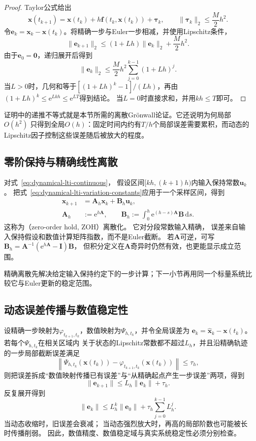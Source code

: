 \begin{proof}
	Taylor公式给出
	\[
		\bm{x}(t_{k+1})
		=\bm{x}(t_k)+h\bm{f}(t_k,\bm{x}(t_k))+\bm{\tau}_k,
		\qquad \lVert\bm{\tau}_k\rVert_2\leq \frac{M}{2}h^2.
	\]
	令$\bm{e}_k=\bm{x}_k-\bm{x}(t_k)$。将精确一步与Euler一步相减，并使用Lipschitz条件，
	\[
		\lVert\bm{e}_{k+1}\rVert_2
		\leq(1+Lh)\lVert\bm{e}_k\rVert_2+\frac{M}{2}h^2.
	\]
	由于$\bm{e}_0=\bm{0}$，递归展开后得到
	\[
		\lVert\bm{e}_k\rVert_2
		\leq\frac{M}{2}h^2\sum_{j=0}^{k-1}(1+Lh)^j.
	\]
	当$L>0$时，几何和等于$[(1+Lh)^k-1]/(Lh)$，再由
	$(1+Lh)^k\leq\mathrm{e}^{Lkh}\leq\mathrm{e}^{LT}$得到结论。
	当$L=0$时直接求和，并用$kh\leq T$即可。
\end{proof}

证明中的递推不等式就是本节所需的离散Grönwall论证。它还说明为何局部$O(h^2)$
只得到全局$O(h)$：固定时间内约有$T/h$个局部误差需要累积，而动态的Lipschitz因子控制这些误差随后被放大的程度。

\subsection{零阶保持与精确线性离散}

对式~\eqref{eq:dynamical-lti-continuous}， 假设区间$[kh,(k+1)h)$内输入保持常数$\bm
{u}_{k}$。 把式~\eqref{eq:dynamical-lti-variation-constants}应用于一个采样区间，得到
\begin{align}
	\bm{x}_{k+1} & = \bm{A}_{h}\bm{x}_{k}+\bm{B}_{h}\bm{u}_{k}, \label{eq:dynamical-zoh-discrete}                                                          \\
	\bm{A}_{h}   & := \mathrm{e}^{h\bm{A}}, \qquad \bm{B}_{h}:= \int_{0}^{h}\mathrm{e}^{(h-s)\bm{A}}\bm{B}\,\mathrm{d}s. \label{eq:dynamical-zoh-matrices}
\end{align}
这称为（zero-order hold, ZOH）离散化。 它对分段常数输入精确， 误差来自输入保持假设和数值计算矩阵指数，而不是Euler截断。
若$\bm{A}$可逆，可写 $\bm{B}_{h}=\bm{A}^{-1}(\mathrm{e}^{h\bm{A}}-\bm{I})\bm{B}$，
但积分定义在$\bm{A}$奇异时仍然有效，也更能显示成立范围。

精确离散先解决给定输入保持约定下的一步计算；下一小节再用同一个标量系统比较它与Euler更新的稳定范围。

\subsection{动态误差传播与数值稳定性}

设精确一步映射为$\varphi_{t_{k+1},t_k}$，数值映射为$\Psi_{h,t_k}$，并令全局误差为
$\bm{e}_{k}=\widehat{\bm{x}}_{k}-\bm{x}(t_{k})$。若每个$\Psi_{h,t_k}$在相关区域内
关于状态的Lipschitz常数都不超过$L_h$，并且沿精确轨迹的一步局部截断误差满足
\[
	\left\lVert
	\Psi_{h,t_k}(\bm{x}(t_k))
	-\varphi_{t_{k+1},t_k}(\bm{x}(t_k))
	\right\rVert
	\leq\tau_h,
\]
则把误差拆成“数值映射传播已有误差”与“从精确起点产生一步误差”两项，得到
\[
	\lVert\bm{e}_{k+1}\rVert \leq L_{h}\lVert\bm{e}_{k}\rVert+\tau_{h}.
\]
反复展开得到
\[
	\lVert\bm{e}_{k}\rVert \leq L_{h}^{k}\lVert\bm{e}_{0}\rVert+ \tau_{h}\sum_{j=0}
	^{k-1}L_{h}^{j}.
\]
当动态收缩时，旧误差会衰减； 当动态强烈放大时，再高的局部阶数也可能被长时传播削弱。
因此，数值精度、数值稳定域与真实系统稳定性必须分别检查。

